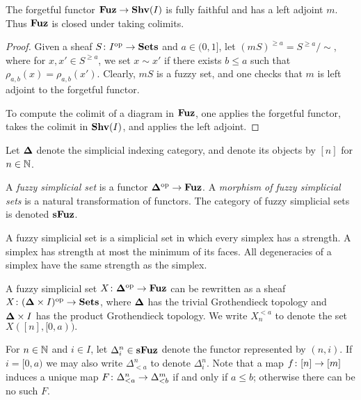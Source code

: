 \documentclass{amsart}
\def\Shv{\She}
\def\bD{{\bf \Delta}}
\def\Fuz{{\bf Fuz}}
\def\sFuz{{\bf sFuz}}
\begin{document}
\begin{lemma}

The forgetful functor $\Fuz\to\Shv(I)$ is fully faithful and has a left adjoint $m$.  Thus $\Fuz$ is closed under taking colimits.

\end{lemma}

\begin{proof}

Given a sheaf $S\colon I^\textnormal{op}\rightarrow{\bf Sets}$ and $a\in (0,1]$, let $(mS)^{\geq a}=S^{\geq a}/\sim$, where for $x,x'\in S^{\geq a}$, we set $x\sim x'$ if there exists $b\leq a$ such that $\rho_{a,b}(x)=\rho_{a,b}(x')$.  Clearly, $mS$ is a fuzzy set, and one checks that $m$ is left adjoint to the forgetful functor.  

To compute the colimit of a diagram in $\Fuz$, one applies the forgetful functor, takes the colimit in $\Shv(I)$, and applies the left adjoint.

\end{proof}

Let $\bD$ denote the simplicial indexing category, and denote its objects by $[n]$ for $n\in{\mathbb N}$.

\begin{definition}

A {\em fuzzy simplicial set} is a functor $\bD\op\to\Fuz$.  A {\em morphism of fuzzy simplicial sets} is a natural transformation of functors.   The category of fuzzy simplicial sets is denoted $\sFuz$.

\end{definition}

A fuzzy simplicial set is a simplicial set in which every simplex has a strength.  A simplex has strength at most the minimum of its faces.  All degeneracies of a simplex have the same strength as the simplex.

A fuzzy simplicial set $X\taking\bD\op\to\Fuz$ can be rewritten as a sheaf $X\taking(\bD\cross I)\op\to\Sets$, where $\bD$ has the trivial Grothendieck topology and $\bD\cross I$ has the product Grothendieck topology.  We write $X_n^{<a}$ to denote the set $X([n],[0,a)).$

For $n\in{\mathbb N}$ and $i\in I$, let $\Delta^n_i\in\sFuz$ denote the functor represented by $(n,i)$.  If $i=[0,a)$  we may also write $\Delta^n_{<a}$ to denote $\Delta^n_i$.  Note that a map $f\colon[n]\rightarrow[m]$ induces a unique map $F\colon\Delta^n_{<a}\rightarrow\Delta^m_{<b}$ if and only if $a\leq b$; otherwise there can be no such $F$.
\end{document}
